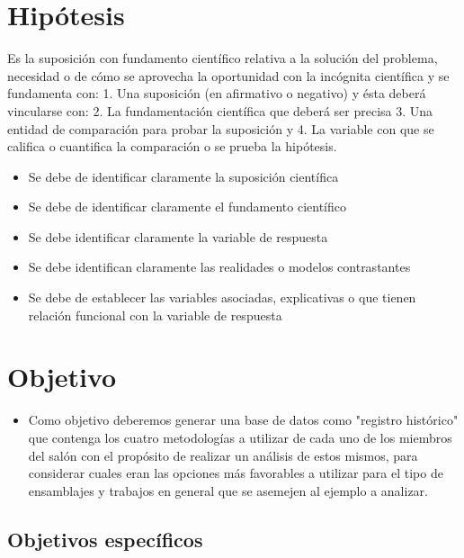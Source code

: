     \section{Hipótesis}
    
    Es la suposición con fundamento científico relativa a la solución del problema, necesidad o de cómo se aprovecha la oportunidad con la incógnita científica y se fundamenta con: 1. Una suposición (en afirmativo o negativo) y ésta deberá vincularse con:
    2. La fundamentación científica que deberá ser precisa 3. Una entidad de comparación para probar la suposición y
    4. La variable con que se califica o cuantifica la comparación o se prueba la hipótesis.
    
    \begin{itemize}
        \item Se debe de identificar claramente la suposición científica
        \item Se debe de identificar claramente el fundamento científico
        \item Se debe identificar claramente la variable de respuesta
        \item Se debe identifican claramente las realidades o modelos contrastantes
        \item Se debe de establecer las variables asociadas, explicativas o que tienen relación funcional con la variable de respuesta
    \end{itemize}
    \section{Objetivo}
    
    \begin{itemize}
        \item Como objetivo deberemos generar una base de datos como "registro histórico" que contenga los cuatro metodologías a utilizar de cada uno de los miembros del salón con el propósito de realizar un análisis de estos mismos, para considerar cuales eran las opciones más favorables a utilizar para el tipo de ensamblajes y trabajos en general que se asemejen al ejemplo a analizar.
    \end{itemize}
    
    \subsection{Objetivos específicos }
    
